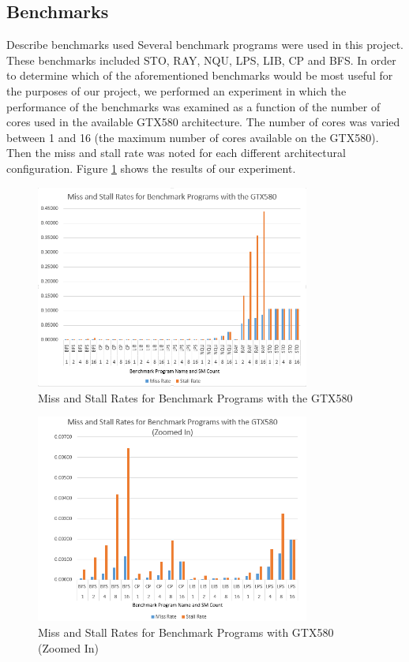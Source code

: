 \subsection{Benchmarks}
Describe benchmarks used 
Several benchmark programs were used in this project. These benchmarks included STO, RAY, NQU, LPS, LIB, CP and BFS. In order to determine which of the aforementioned benchmarks would be most useful for the purposes of our project, we performed an experiment in which the performance of the benchmarks was examined as a function of the number of cores used in the available GTX580 architecture. The number of cores was varied between 1 and 16 (the maximum number of cores available on the GTX580). Then the miss and stall rate was noted for each different architectural configuration. Figure \ref{fig:missStalls} shows the results of our experiment. 

\begin{figure}[b!]
\centering
\includegraphics[width=90mm]{miss_stalls_benchmarks.png}
\caption{Miss and Stall Rates for Benchmark Programs with the GTX580}
\label{fig:missStalls}
\end{figure}

\begin{figure}[b!]
\centering
\includegraphics[width=90mm]{miss_stalls_benchmarks_zoomed.png}
\caption{Miss and Stall Rates for Benchmark Programs with GTX580 (Zoomed In) }
\label{fig:missStallsZoomed}
\end{figure}

